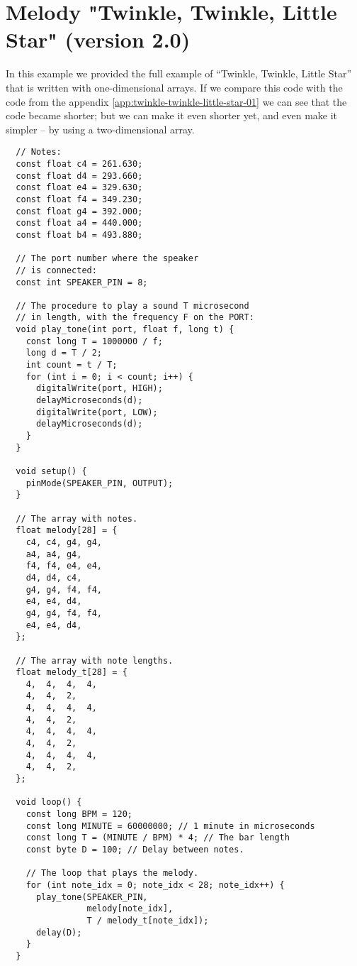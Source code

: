 \documentclass[../sparc.tex]{subfiles}
\begin{document}
\newpage
\chapter{Melody "Twinkle, Twinkle, Little Star" (version 2.0)}
\label{app:twinkle-twinkle-little-star-02}

In this example we provided the full example of ``Twinkle, Twinkle, Little
Star'' that is written with one-dimensional arrays.  If we compare this code
with the code from the appendix \ref{app:twinkle-twinkle-little-star-01} we can
see that the code became shorter; but we can make it even shorter yet, and even
make it simpler -- by using a two-dimensional array.

\begin{verbatim}
  // Notes:
  const float c4 = 261.630;
  const float d4 = 293.660;
  const float e4 = 329.630;
  const float f4 = 349.230;
  const float g4 = 392.000;
  const float a4 = 440.000;
  const float b4 = 493.880;

  // The port number where the speaker
  // is connected:
  const int SPEAKER_PIN = 8;

  // The procedure to play a sound T microsecond
  // in length, with the frequency F on the PORT:
  void play_tone(int port, float f, long t) {
    const long T = 1000000 / f;
    long d = T / 2;
    int count = t / T;
    for (int i = 0; i < count; i++) {
      digitalWrite(port, HIGH);
      delayMicroseconds(d);
      digitalWrite(port, LOW);
      delayMicroseconds(d);
    }
  }

  void setup() {
    pinMode(SPEAKER_PIN, OUTPUT);
  }

  // The array with notes.
  float melody[28] = {
    c4, c4, g4, g4,
    a4, a4, g4,
    f4, f4, e4, e4,
    d4, d4, c4,
    g4, g4, f4, f4,
    e4, e4, d4,
    g4, g4, f4, f4,
    e4, e4, d4,
  };

  // The array with note lengths.
  float melody_t[28] = {
    4,  4,  4,  4,
    4,  4,  2,
    4,  4,  4,  4,
    4,  4,  2,
    4,  4,  4,  4,
    4,  4,  2,
    4,  4,  4,  4,
    4,  4,  2,
  };

  void loop() {
    const long BPM = 120;
    const long MINUTE = 60000000; // 1 minute in microseconds
    const long T = (MINUTE / BPM) * 4; // The bar length
    const byte D = 100; // Delay between notes.

    // The loop that plays the melody.
    for (int note_idx = 0; note_idx < 28; note_idx++) {
      play_tone(SPEAKER_PIN,
                melody[note_idx],
                T / melody_t[note_idx]);
      delay(D);
    }
  }
\end{verbatim}
\end{document}

